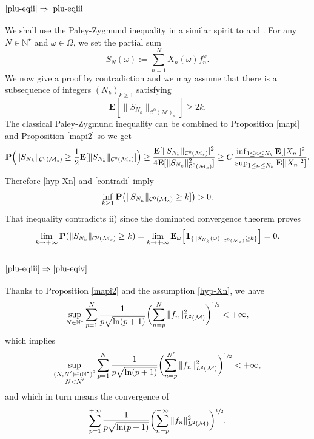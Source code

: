 \documentclass[11pt]{article}
\theoremstyle{theorem}
\theoremstyle{definition}
\newcommand\E{\mathbf{E}}
\newcommand\N{\mathbb{N}}
\newcommand\CC{\mathcal{C}}
\newcommand\pun{\mathbf{1}}
\begin{document}
\subsubsection*{$\eqref{plu-eqii}\Rightarrow\eqref{plu-eqiii}$}
We shall use the Paley-Zygmund inequality in a similar spirit to
\cite[p.\,55, Lem.\,1.2]{pisier1981} and \cite[Prop.\,2.17]{imek-crusep}. For any $N\in \N^\star$ and $\omega\in \Omega$, we set the partial sum
\begin{equation*}
S_N(\omega):=\sum_{n=1}^N X_n(\omega) f_n^{\omega}.
\end{equation*}
We now give a proof by contradiction and we may assume that there is a subsequence of integers $(N_k)_{k\geq 1}$ satisfying
\begin{equation}\label{contradi}
\E[\|S_{N_k}\|_{\CC^0(\mathcal{M})_s}]\geq 2k.
\end{equation}
The classical Paley-Zygmund inequality \cite[p.\,8, Ineq.\,II]{kahane} can be combined to Proposition \ref{mapi} and Proposition \ref{mapi2} so we get
\begin{equation*}
\P\Big(\|S_{N_k}\|_{\CC^0(\mathcal{M}_s)} \geq \frac{1}{2} \E[\|S_{N_k}\|_{\CC^0(\mathcal{M}_s)}]\Big)\geq \frac{\E[\|S_{N_k}\|_{\CC^0(\mathcal{M}_s)}]^2}{4
\E[\|S_{N_k}\|_{\CC^0(\mathcal{M}_s)}^2]} \geq C\,\frac{\inf_{1\leq n\leq N_k}\E[|X_n|]^2}{\sup_{1\leq n \leq N_k} \E[|X_n|^2] }.
\end{equation*}
Therefore \eqref{hyp-Xn} and \eqref{contradi} imply
\begin{equation*}
\inf_{k\geq 1} \P\bigl(\|S_{N_k}\|_{\CC^0(\mathcal{M}_s)} \geq k]\bigr)>0.
\end{equation*}
That inequality contradicts ii) since the dominated convergence theorem proves
\begin{equation*}
\lim_{k\to +\infty} \P(\|S_{N_k} \|_{\CC^0(\mathcal{M}_s)}\geq k)=\lim_{k\to +\infty} \E_{\omega}\Big[\pun_{\{\|S_{N_k}(\omega) \|_{\CC^0(\mathcal{M}_s)}\geq k\}}\Big]=0.
\end{equation*}

\subsubsection*{$\eqref{plu-eqiii}\Rightarrow\eqref{plu-eqiv}$}
Thanks to Proposition \ref{mapi2} and the assumption \eqref{hyp-Xn}, we have
\begin{equation*}
\sup_{N\in \N^\star} \sum_{p=1}^N \frac{1}{p\sqrt{\ln(p+1)}} \biggl(\sum_{n=p}^{N} \|f_n\|_{L^2(\mathcal{M})}^2 \biggr)^{\sfrac{1}{2}}<+\infty,
\end{equation*}
which implies
\begin{equation*}
\sup_{\substack{(N,N')\in (\N^\star)^2 \\ N<N' }} \sum_{p=1}^{N} \frac{1}{p\sqrt{\ln(p+1)}} \biggl(\sum_{n=p}^{N'} \|f_n\|_{L^2(\mathcal{M})}^2 \biggr)^{\sfrac{1}{2}} <+\infty,
\end{equation*}
and which in turn means the convergence of
\[
\sum_{p=1}^{+\infty} \frac{1}{p\sqrt{\ln(p+1)}} \biggl(\sum_{n=p}^{+\infty} \|f_n\|_{L^2(\mathcal{M})}^2 \biggr)^{\sfrac{1}{2}}.
\]
\end{document}
